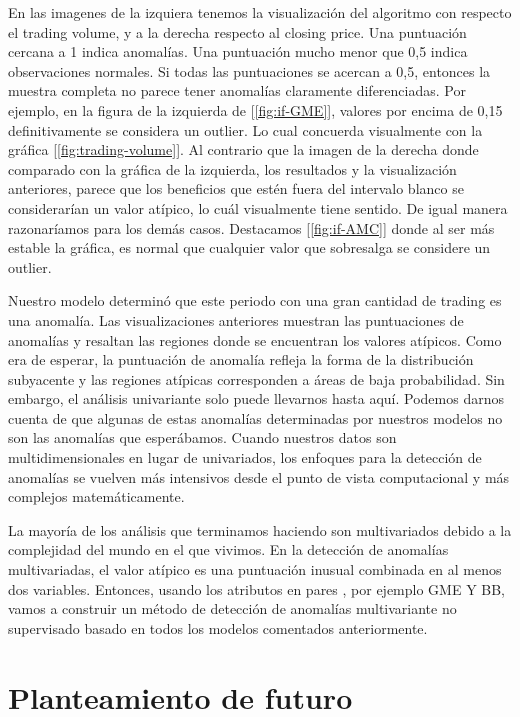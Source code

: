 \documentclass[12pt,twoside]{report}
\begin{document}
En las imagenes de la izquiera tenemos la visualización del algoritmo  con respecto el trading volume, y a la derecha respecto al closing price. Una puntuación cercana a 1 indica anomalías. Una puntuación mucho menor que 0,5 indica observaciones normales. Si todas las puntuaciones se acercan a 0,5, entonces la muestra completa no parece tener anomalías claramente diferenciadas. Por ejemplo, en la figura de la izquierda de [\ref{fig:if-GME}], valores por encima de 0,15 definitivamente se considera un outlier. Lo cual concuerda visualmente con la gráfica [\ref{fig:trading-volume}]. Al contrario que la imagen de la derecha donde comparado con la gráfica de la izquierda, los resultados y la visualización anteriores, parece que los beneficios que estén fuera del intervalo blanco se considerarían un valor atípico, lo cuál visualmente tiene sentido. De igual manera razonaríamos para los demás casos. Destacamos [\ref{fig:if-AMC}] donde al ser más estable la gráfica, es normal que cualquier valor que sobresalga se considere un outlier.

Nuestro modelo determinó que este periodo con una gran cantidad de trading es una anomalía. Las visualizaciones anteriores muestran las puntuaciones de anomalías y resaltan las regiones donde se encuentran los valores atípicos. Como era de esperar, la puntuación de anomalía refleja la forma de la distribución subyacente y las regiones atípicas corresponden a áreas de baja probabilidad.
Sin embargo, el análisis univariante solo puede llevarnos hasta aquí. Podemos darnos cuenta de que algunas de estas anomalías determinadas por nuestros modelos no son las anomalías que esperábamos. Cuando nuestros datos son multidimensionales en lugar de univariados, los enfoques para la detección de anomalías se vuelven más intensivos desde el punto de vista computacional y más complejos matemáticamente.

La mayoría de los análisis que terminamos haciendo son multivariados debido a la complejidad del mundo en el que vivimos. En la detección de anomalías multivariadas, el valor atípico es una puntuación inusual combinada en al menos dos variables.
Entonces, usando los atributos en pares , por ejemplo GME Y BB, vamos a construir un método de detección de anomalías multivariante no supervisado basado en todos los modelos comentados anteriormente.


\chapter*{Planteamiento de futuro}


\medskip

\printbibliography[
heading=bibintoc,
title={Referencias}
]
\end{document}
